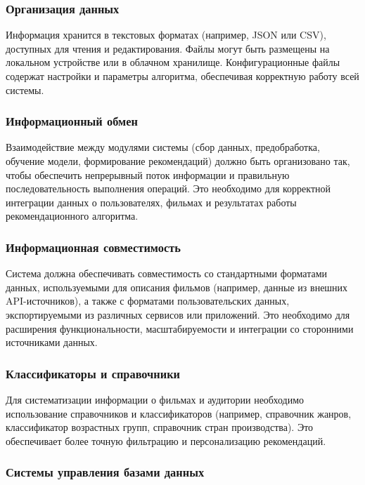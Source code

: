 \subsubsection{Организация данных}

Информация хранится в текстовых форматах (например, JSON или CSV), доступных для чтения и редактирования.
Файлы могут быть размещены на локальном устройстве или в облачном хранилище.
Конфигурационные файлы содержат настройки и параметры алгоритма,
обеспечивая корректную работу всей системы.

\subsubsection{Информационный обмен}

Взаимодействие между модулями системы (сбор данных, предобработка, обучение модели, формирование рекомендаций)
должно быть организовано так, чтобы обеспечить непрерывный поток информации и правильную
последовательность выполнения операций. Это необходимо для корректной интеграции данных о пользователях,
фильмах и результатах работы рекомендационного алгоритма.

\subsubsection{Информационная совместимость}

Система должна обеспечивать совместимость со стандартными форматами данных,
используемыми для описания фильмов (например, данные из внешних API-источников),
а также с форматами пользовательских данных, экспортируемыми из различных
сервисов или приложений. Это необходимо для расширения функциональности,
масштабируемости и интеграции со сторонними источниками данных.

\subsubsection{Классификаторы и справочники}

Для систематизации информации о фильмах и аудитории необходимо использование
справочников и классификаторов (например, справочник жанров, классификатор возрастных групп,
справочник стран производства). Это обеспечивает более точную фильтрацию и персонализацию рекомендаций.

\subsubsection{Системы управления базами данных}

